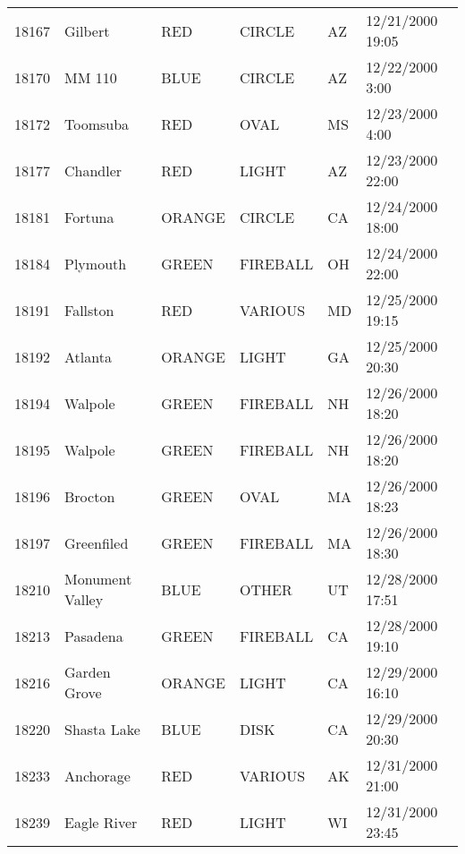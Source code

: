 \begin{tabular}{llllll}
18167 & Gilbert & RED & CIRCLE & AZ & 12/21/2000 19:05 \\
18170 & MM 110 & BLUE & CIRCLE & AZ & 12/22/2000 3:00 \\
18172 & Toomsuba & RED & OVAL & MS & 12/23/2000 4:00 \\
18177 & Chandler & RED & LIGHT & AZ & 12/23/2000 22:00 \\
18181 & Fortuna & ORANGE & CIRCLE & CA & 12/24/2000 18:00 \\
18184 & Plymouth & GREEN & FIREBALL & OH & 12/24/2000 22:00 \\
18191 & Fallston & RED & VARIOUS & MD & 12/25/2000 19:15 \\
18192 & Atlanta & ORANGE & LIGHT & GA & 12/25/2000 20:30 \\
18194 & Walpole & GREEN & FIREBALL & NH & 12/26/2000 18:20 \\
18195 & Walpole & GREEN & FIREBALL & NH & 12/26/2000 18:20 \\
18196 & Brocton & GREEN & OVAL & MA & 12/26/2000 18:23 \\
18197 & Greenfiled & GREEN & FIREBALL & MA & 12/26/2000 18:30 \\
18210 & Monument Valley & BLUE & OTHER & UT & 12/28/2000 17:51 \\
18213 & Pasadena & GREEN & FIREBALL & CA & 12/28/2000 19:10 \\
18216 & Garden Grove & ORANGE & LIGHT & CA & 12/29/2000 16:10 \\
18220 & Shasta Lake & BLUE & DISK & CA & 12/29/2000 20:30 \\
18233 & Anchorage & RED & VARIOUS & AK & 12/31/2000 21:00 \\
18239 & Eagle River & RED & LIGHT & WI & 12/31/2000 23:45 \\
\bottomrule
\end{tabular}
